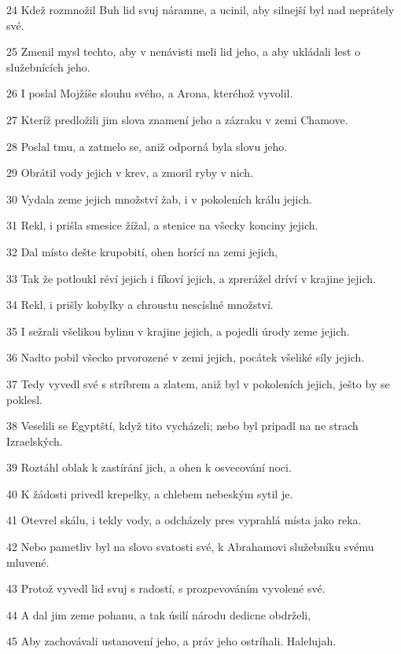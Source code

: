 \par 24 Kdež rozmnožil Buh lid svuj náramne, a ucinil, aby silnejší byl nad neprátely své.
\par 25 Zmenil mysl techto, aby v nenávisti meli lid jeho, a aby ukládali lest o služebnících jeho.
\par 26 I poslal Mojžíše slouhu svého, a Arona, kteréhož vyvolil.
\par 27 Kteríž predložili jim slova znamení jeho a zázraku v zemi Chamove.
\par 28 Poslal tmu, a zatmelo se, aniž odporná byla slovu jeho.
\par 29 Obrátil vody jejich v krev, a zmoril ryby v nich.
\par 30 Vydala zeme jejich množství žab, i v pokoleních králu jejich.
\par 31 Rekl, i prišla smesice žížal, a stenice na všecky konciny jejich.
\par 32 Dal místo dešte krupobití, ohen horící na zemi jejich,
\par 33 Tak že potloukl réví jejich i fíkoví jejich, a zprerážel dríví v krajine jejich.
\par 34 Rekl, i prišly kobylky a chroustu nescíslné množství.
\par 35 I sežrali všelikou bylinu v krajine jejich, a pojedli úrody zeme jejich.
\par 36 Nadto pobil všecko prvorozené v zemi jejich, pocátek všeliké síly jejich.
\par 37 Tedy vyvedl své s stríbrem a zlatem, aniž byl v pokoleních jejich, ješto by se poklesl.
\par 38 Veselili se Egyptští, když tito vycházeli; nebo byl pripadl na ne strach Izraelských.
\par 39 Roztáhl oblak k zastírání jich, a ohen k osvecování noci.
\par 40 K žádosti privedl krepelky, a chlebem nebeským sytil je.
\par 41 Otevrel skálu, i tekly vody, a odcházely pres vyprahlá místa jako reka.
\par 42 Nebo pametliv byl na slovo svatosti své, k Abrahamovi služebníku svému mluvené.
\par 43 Protož vyvedl lid svuj s radostí, s prozpevováním vyvolené své.
\par 44 A dal jim zeme pohanu, a tak úsilí národu dedicne obdrželi,
\par 45 Aby zachovávali ustanovení jeho, a práv jeho ostríhali. Halelujah.

